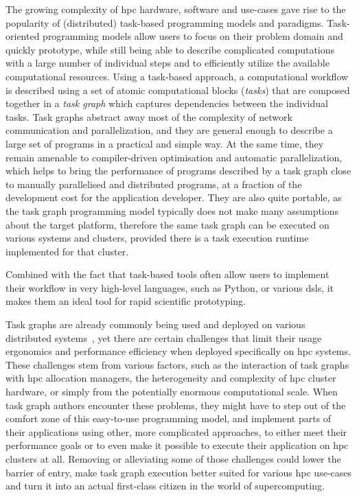 The growing complexity of \gls{hpc} hardware, software and use-cases gave rise to the
popularity of (distributed) task-based programming models and paradigms. Task-oriented programming
models allow users to focus on their problem domain and quickly prototype, while still being able
to describe complicated computations with a large number of individual steps and to efficiently
utilize the available computational resources. Using a task-based approach, a computational
workflow is described using a set of atomic computational blocks (\emph{tasks}) that are
composed together in a \emph{task graph} which captures dependencies between the individual
tasks. Task graphs abstract away most of the complexity of network communication and
parallelization, and they are general enough to describe a large set of programs in a practical and
simple way. At the same time, they remain amenable to compiler-driven optimisation and automatic
parallelization, which helps to bring the performance of programs described by a task graph close
to manually parallelised and distributed programs, at a fraction of the development cost for the
application developer. They are also quite portable, as the task graph programming model typically
does not make many assumptions about the target platform, therefore the same task graph can be
executed on various systems and clusters, provided there is a task execution runtime implemented
for that cluster.

Combined with the fact that task-based tools often allow users to implement their workflow in very
high-level languages, such as Python, or various \glspl{dsl}, it makes them an ideal
tool for rapid scientific prototyping.

Task graphs are already commonly being used and deployed on various distributed
systems~\cite{pegasus, workflows_at_scale, large_scale_modelling}, yet there are certain challenges that limit their usage ergonomics
and performance efficiency when deployed specifically on \gls{hpc} systems. These
challenges stem from various factors, such as the interaction of task graphs with
\gls{hpc} allocation managers, the heterogeneity and complexity of
\gls{hpc} cluster hardware, or simply from the potentially enormous computational
scale. When task graph authors encounter these problems, they might have to step out of the comfort
zone of this easy-to-use programming model, and implement parts of their applications using other,
more complicated approaches, to either meet their performance goals or to even make it possible to
execute their application on \gls{hpc} clusters at all. Removing or alleviating some
of those challenges could lower the barrier of entry, make task graph execution better suited for
various \gls{hpc} use-cases and turn it into an actual first-class citizen in the
world of supercomputing\@.

